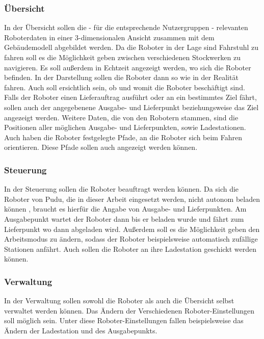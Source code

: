 \subsubsection{Übersicht}

In der Übersicht sollen die - für die entsprechende Nutzergruppen - relevanten Roboterdaten in einer 3-dimensionalen Ansicht zusammen mit dem Gebäudemodell abgebildet werden. Da die Roboter in der Lage sind Fahrstuhl zu fahren soll es die Möglichkeit geben zwischen verschiedenen Stockwerken zu navigieren. Es soll außerdem in Echtzeit angezeigt werden, wo sich die Roboter befinden. In der Darstellung sollen die Roboter dann so wie in der Realität fahren. Auch soll ersichtlich sein, ob und womit die Roboter beschäftigt sind. Falls der Roboter einen Lieferauftrag ausführt oder an ein bestimmtes Ziel fährt, sollen auch der angegebenene Ausgabe- und Lieferpunkt beziehungsweise das Ziel angezeigt werden. Weitere Daten, die von den Robotern stammen, sind die Positionen aller möglichen Ausgabe- und Lieferpunkten, sowie Ladestationen. Auch haben die Roboter festgelegte Pfade, an die Roboter sich beim Fahren orientieren. Diese Pfade sollen auch angezeigt werden können.

\subsubsection{Steuerung}

In der Steuerung sollen die Roboter beauftragt werden können. Da sich die Roboter von Pudu, die in dieser Arbeit eingesetzt werden, nicht autonom beladen können \cite{KettyBot2024}, braucht es hierfür die Angabe von Ausgabe- und Lieferpunkten. Am Ausgabepunkt wartet der Roboter dann bis er beladen wurde und fährt zum Lieferpunkt wo dann abgeladen wird. Außerdem soll es die Möglichkeit geben den Arbeitsmodus zu ändern, sodass der Roboter beispielsweise automatisch zufällige Stationen anfährt. Auch sollen die Roboter an ihre Ladestation geschickt werden können.

\subsubsection{Verwaltung}

In der Verwaltung sollen sowohl die Roboter als auch die Übersicht selbst verwaltet werden können. Das Ändern der Verschiedenen Roboter-Einstellungen soll möglich sein. Unter diese Roboter-Einstellungen fallen beispielsweise das Ändern der Ladestation und des Ausgabepunkts.

